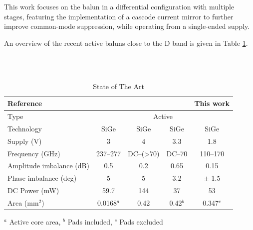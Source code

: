 This work focuses on the balun in a differential configuration with multiple stages, featuring the implementation of a cascode current mirror to further improve common-mode suppression, while operating from a single-ended supply. 

An overview of the recent active baluns close to the D band is given in Table \ref{tab:comparison}.

\mbox{}\\
\mbox{}\\

\begin{table}[h!]
\centering
\renewcommand{\arraystretch}{1.4} %
\begin{tabular}{|l|c|c|c|c|}
\hline
Reference & \cite{Active BALUN with 40 GHz bandwidth at 257 GHz} & \cite{Active Single-Ended to Differential Converter (Balun) for DC up to 70 GHz in 130 nm SiGe} & \cite{Ultra Broadband Low-Power 70 GHz Active Balun in 130-nm SiGe BiCMOS} & This work \\ 
\hline
Type & \multicolumn{4}{c|}{Active} \\ 
\hline
Technology & SiGe & SiGe & SiGe & SiGe \\ 
\hline
Supply (V) & 3 & 4 & 3.3 & 1.8 \\ 
\hline
Frequency (GHz) & 237--277 & DC--(>70) & DC--70 & 110--170 \\ 
\hline
Amplitude imbalance (dB) & 0.5 & 0.2 & 0.65 & 0.15 \\ 
\hline
Phase imbalance (deg) & 5 & 5 & 3.2 &  $\pm$ 1.5 \\ 
\hline
DC Power (mW) & 59.7 & 144 & 37 & 53 \\ 
\hline
Area (mm$^2$) & 0.0168$^{a}$ & 0.42 & 0.42$^{b}$ & 0.347$^{c}$ \\ 
\hline
\end{tabular}
\par\vspace{0.1cm}
$^{a}$ Active core area, 
$^{b}$ Pads included, 
$^{c}$ Pads excluded
\caption{State of The Art}
\label{tab:comparison}
\end{table}